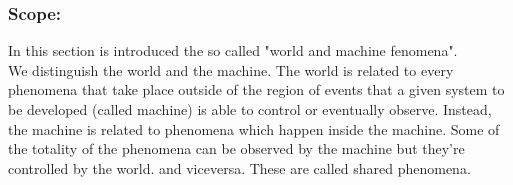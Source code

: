 \documentclass[titlepage]{article}
\begin{document}
\subsubsection{Scope:}
In this section is introduced the so called "world and machine fenomena".\\
We distinguish the world and the machine. The world is related to every phenomena that take place outside of the region of events that a given system to be developed (called machine) is able to control or eventually observe. Instead, the machine is related to phenomena which happen inside the machine. Some of the totality of the phenomena can be observed by the machine but they're controlled by the world.  and viceversa. These are called shared phenomena.
\end{document}
